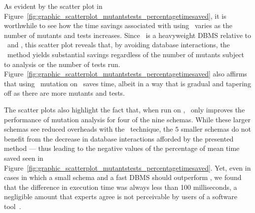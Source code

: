 

 As evident by the scatter plot in Figure~\ref{fig:graphic_scatterplot_mutantstests_percentagetimesaved}, it is worthwhile to see how the time savings associated with using \virtualmutationanalysis~varies as the number of mutants and tests increases. Since \postgres~is a heavyweight DBMS relative to \HyperSQL~and \sqlite, this scatter plot reveals that, by avoiding database interactions, the \virtual~method yields substantial savings regardless of the number of mutants subject to analysis or the number of tests run.  Figure~\ref{fig:graphic_scatterplot_mutantstests_percentagetimesaved} also affirms that using \virtual~mutation on \HyperSQL~saves time, albeit in a way that is gradual and tapering off as there are more mutants and tests.


The scatter plots also highlight the fact that, when run on \sqlite, \virtual~only improves the performance of mutation analysis for four of the nine schemas. While these larger schemas see reduced overheads with the \virtual~technique, the $5$ smaller schemas do not benefit from the decrease in database interactions afforded by the presented method --- thus leading to the negative values of the percentage of mean time saved seen in Figure~\ref{fig:graphic_scatterplot_mutantstests_percentagetimesaved}. Yet, even in cases in which a small schema and a fast DBMS should outperform \vma, we found that the difference in execution time was always less than 100 milliseconds, a negligible amount that experts agree is not perceivable by users of a software tool~\cite{Neumann2015}.


